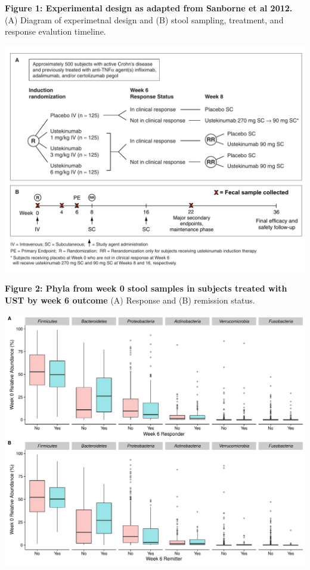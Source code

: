 \documentclass[11pt,]{article}
\begin{document}
\textbf{Figure 1: Experimental design as adapted from Sanborne et al
2012.} (A) Diagram of experimetnal design and (B) stool sampling,
treatment, and response evalution timeline.

\includegraphics{figures/Figure1_expdesign.pdf}

\newpage

\textbf{Figure 2: Phyla from week 0 stool samples in subjects treated
with UST by week 6 outcome} (A) Response and (B) remission status.

\includegraphics{figures/Figure2_wk6phyla.pdf}

\newpage
\end{document}
